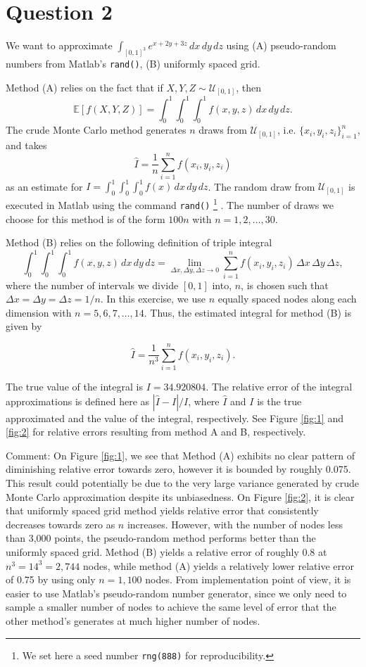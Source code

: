 \documentclass[11pt]{article}
\renewcommand{\E}{\mathbb{E}} %
\newcommand{\1}{\mathbbm{1}}
\newcommand{\U}{\mathcal{U}} %
\newcounter{daggerfootnote}
\newcommand*{\daggerfootnote}[1]{%
	\setcounter{daggerfootnote}{\value{footnote}}%
	\renewcommand*{\thefootnote}{\fnsymbol{footnote}}%
	\footnote[2]{#1}%
	\setcounter{footnote}{\value{daggerfootnote}}%
	\renewcommand*{\thefootnote}{\arabic{footnote}}%
}
\begin{document}
\section*{Question 2}
We want to approximate $\int_{[0,1]^3}e^{x+2y +3z} \,dx \,dy \,dz$ using (A) pseudo-random numbers from Matlab’s \texttt{rand()}, (B) uniformly
spaced grid. 

Method (A) relies on the fact that if $X,Y,Z\sim \U_{[0,1]}$, then 
\[\E[f(X,Y,Z)]=\int_0^1\int_0^1\int_0^1f(x,y,z)\,dx\,dy\,dz.\] 
The crude Monte Carlo method generates $n$ draws from $\U_{[0,1]}$, i.e. $\{x_i,y_i,z_i\}_{i=1}^n$, and takes
\[\hat{I}=\frac{1}{n}\sum_{i=1}^nf(x_i,y_i,z_i)\]
as an estimate for $I=\int_0^1\int_0^1\int_0^1f(x) \,dx \,dy\, dz$. The random draw from $\U_{[0,1]}$ is executed in Matlab using the command \texttt{rand()}\daggerfootnote{We set here a seed number \texttt{rng(888)} for reproducibility.}. The number of draws we choose for this method is of the form $100n$ with $n = 1, 2,\ldots, 30$. 

Method (B) relies on the following definition of triple integral
\[\int_0^1 \int_0^1 \int_0^1 f(x,y,z) \,dx \,dy \,dz = \lim_{\Delta x,\Delta y,\Delta z \rightarrow 0} \sum_{i=1}^n f(x_i,y_i,z_i) \,\Delta x\,\Delta y\,\Delta z,\]
where the number of intervals we divide $[0,1]$ into, $n$, is chosen such that $\Delta x=\Delta y=\Delta z =1/n$. In this exercise, we use $n$ equally spaced nodes along each dimension with $n=5,6,7,\ldots,14$. Thus, the estimated integral for method (B) is given by 

\[\hat{I}=\frac{1}{n^3}\sum_{i=1}^n f(x_i,y_i,z_i).\]

The true value of the integral is $I=34.920804$. The relative error of the integral approximations is defined here as $|\hat{I}-I|/I$, where $\hat{I}$ and $I$ is the true approximated and the value of the integral, respectively. See Figure \ref{fig:1} and \ref{fig:2} for relative errors resulting from method A and B, respectively.

Comment: On Figure \ref{fig:1}, we see that Method (A) exhibits no clear pattern of diminishing relative error towards zero, however it is bounded by roughly 0.075. This result could potentially be due to the very large variance generated by crude Monte Carlo approximation despite its unbiasedness. On Figure \ref{fig:2}, it is clear that uniformly spaced grid method yields relative error that consistently decreases towards zero as $n$ increases. However, with the number of nodes less than 3,000 points, the pseudo-random method performs better than the uniformly spaced grid. Method (B) yields a relative error of roughly 0.8 at $n^3=14^3=2,744$ nodes, while method (A) yields a relatively lower relative error of 0.75 by using only $n=1,100$ nodes. From implementation point of view, it is easier to use Matlab's pseudo-random number generator, since we only need to sample a smaller number of nodes to achieve the same level of error that the other method's generates at much higher number of nodes.  
\end{document}
